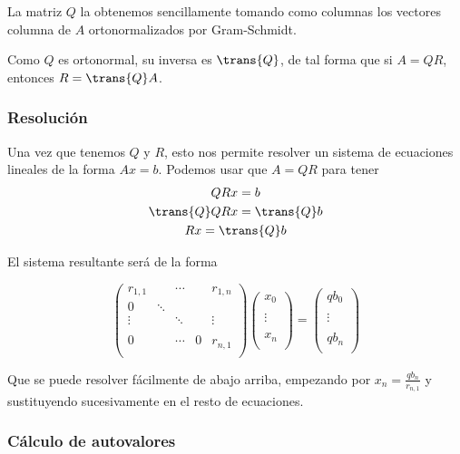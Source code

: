 \documentclass[nochap]{apuntes}
\begin{document}
La matriz $Q$ la obtenemos sencillamente tomando como columnas los vectores columna de $A$ ortonormalizados por Gram-Schmidt.

Como $Q$ es ortonormal, su inversa es $\trans{Q}$, de tal forma que si $A = QR$, entonces $R = \trans{Q}A$.

\subsubsection{Resolución}
Una vez que tenemos $Q$ y $R$, esto nos permite resolver un sistema de ecuaciones lineales de la forma $Ax=b$. Podemos usar que $A = QR$ para tener
\begin{gather*}
QRx = b \\
\trans{Q}QRx = \trans{Q}b \\
Rx = \trans{Q} b \\
\end{gather*}

El sistema resultante será de la forma

\[ \begin{pmatrix}
 r_{1,1} & &\dotsb & & r_{1, n} \\
0 & \ddots & & &  \\
\vdots & &\ddots & & \vdots \\
 &  & & &  \\
0 & & \cdots & 0 & r_{n, 1} \\
\end{pmatrix} \begin{pmatrix} x_0 \\  \\ \vdots \\ \\ x_n\\ \end{pmatrix} =   \begin{pmatrix} qb_0 \\  \\ \vdots \\ \\ qb_n\\ \end{pmatrix}\]

Que se puede resolver fácilmente de abajo arriba, empezando por $x_n = \frac{qb_n}{r_{n,1}}$ y sustituyendo sucesivamente en el resto de ecuaciones.

\subsubsection{Cálculo de autovalores}
\end{document}
